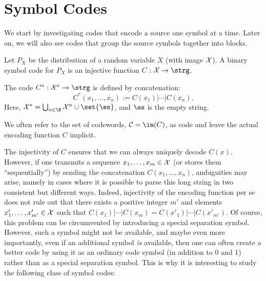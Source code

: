 



\section{Symbol Codes}
We start by investigating codes that encode a source one symbol at a time. Later on, we will also see codes that group the source symbols together into blocks.
\begin{definition}
Let $P_X$ be the distribution of a random variable $X$ (with image ${\cal X}$). A binary symbol code for $P_X$ is an injective function $C : {\cal X} \to \strg$.

The  code $C^* : {\cal X}^* \to \strg$ is defined by concatenation:
\[
C^*(x_1, \ldots, x_n) := C(x_1) | \cdots |C(x_n).
\]
Here, ${\cal X}^* = \bigcup_{n \in \N} {\cal X}^n \cup \set{\es}$, and $\es$ is the empty string.
\end{definition}
We often refer to the set of codewords, ${\cal C} = \im(C)$, as code and leave the actual encoding function $C$ implicit. 

The injectivity of $C$ ensures that we can always uniquely decode $C(x)$. However, if one transmits a sequence $x_1, \ldots, x_m\in {\cal X}$
(or stores them ``sequentially'') by sending the concatenation $C(x_1, \ldots, x_n)$, ambiguities may arise, namely in cases where it is possible to parse this long
string in two consistent but different ways. Indeed, injectivity of
the encoding function per se does not rule out that there exists a
positive integer $m'$ and elements $x'_1, \ldots, x'_{m'}\in {\cal X}$
such that $C(x_1)| \cdots | C(x_m)=C(x'_1)| \cdots | C(x'_{m'})$. Of course, this problem can be circumvented by introducing a special separation symbol. However, such a symbol might not be available, and maybe even more importantly, even if an additional symbol {\em is} available, then one can often create a better code by using it as an ordinary code symbol (in addition to 0 and 1) rather than as a special separation symbol. This is why it is interesting to study the following class of symbol codes:

